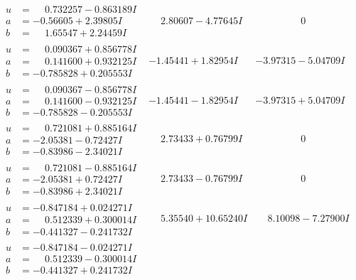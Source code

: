 \documentclass[1p]{elsarticle_modified}
\theoremstyle{definition}
\begin{document}
$$\begin{array}{c|c|c}
\begin{aligned}
u &= \phantom{-}0.732257 - 0.863189 I \\
a &= -0.56605 + 2.39805 I \\
b &= \phantom{-}1.65547 + 2.24459 I\end{aligned}
 & \phantom{-}2.80607 - 4.77645 I & \phantom{-0.000000 } 0 \\ \hline\begin{aligned}
u &= \phantom{-}0.090367 + 0.856778 I \\
a &= \phantom{-}0.141600 + 0.932125 I \\
b &= -0.785828 + 0.205553 I\end{aligned}
 & -1.45441 + 1.82954 I & -3.97315 - 5.04709 I \\ \hline\begin{aligned}
u &= \phantom{-}0.090367 - 0.856778 I \\
a &= \phantom{-}0.141600 - 0.932125 I \\
b &= -0.785828 - 0.205553 I\end{aligned}
 & -1.45441 - 1.82954 I & -3.97315 + 5.04709 I \\ \hline\begin{aligned}
u &= \phantom{-}0.721081 + 0.885164 I \\
a &= -2.05381 - 0.72427 I \\
b &= -0.83986 - 2.34021 I\end{aligned}
 & \phantom{-}2.73433 + 0.76799 I & \phantom{-0.000000 } 0 \\ \hline\begin{aligned}
u &= \phantom{-}0.721081 - 0.885164 I \\
a &= -2.05381 + 0.72427 I \\
b &= -0.83986 + 2.34021 I\end{aligned}
 & \phantom{-}2.73433 - 0.76799 I & \phantom{-0.000000 } 0 \\ \hline\begin{aligned}
u &= -0.847184 + 0.024271 I \\
a &= \phantom{-}0.512339 + 0.300014 I \\
b &= -0.441327 - 0.241732 I\end{aligned}
 & \phantom{-}5.35540 + 10.65240 I & \phantom{-}8.10098 - 7.27900 I \\ \hline\begin{aligned}
u &= -0.847184 - 0.024271 I \\
a &= \phantom{-}0.512339 - 0.300014 I \\
b &= -0.441327 + 0.241732 I\end{aligned}

\end{array}$$
\end{document}
